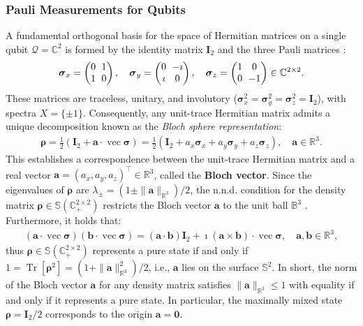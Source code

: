\documentclass[noinfoline]{imsart}\setcounter{tocdepth}{2}
\renewcommand{\b}[1]{\mathbb{#1}} %
\newcommand{\m}[1]{\mathbf{#1}} %
\renewcommand{\c}[1]{\mathcal{#1}} %
\newcommand{\mb}[1]{\boldsymbol{#1}} %
\newcommand{\tr}[1]{\operatorname{Tr}\left[#1\right]}
\renewcommand{\vec}{\operatorname{vec}}
\theoremstyle{plain}
\begin{document}
\subsubsection{Pauli Measurements for Qubits}
A fundamental orthogonal basis for the space of Hermitian matrices on a single qubit $\c{Q} = \b{C}^{2}$ is formed by the identity matrix $\m{I}_{2}$ and the three Pauli matrices \cite{nielsen2010quantum}:
\begin{equation*}
    \setlength{\arraycolsep}{0.3em} %
    \mb{\sigma}_{x} = 
    \begin{pmatrix}
    0 & 1 \\
    1 & 0 \vphantom{-1}
    \end{pmatrix}, \quad
    \mb{\sigma}_{y} = 
    \begin{pmatrix}
    0 & -\imath \\
    \imath & 0
    \end{pmatrix}, \quad
    \mb{\sigma}_{z} = 
    \begin{pmatrix}
    1 & 0 \\
    0 & -1
    \end{pmatrix} \in \b{C}^{2 \times 2}.
\end{equation*}
These matrices are traceless, unitary, and involutory ($\mb{\sigma}_{x}^{2}=\mb{\sigma}_{y}^{2}= \mb{\sigma}_{z}^{2}= \m{I}_{2}$), with spectra $X = \{\pm 1 \}$. 
Consequently, any unit-trace Hermitian matrix admits a unique decomposition known as the \emph{Bloch sphere representation}:
\begin{align}\label{eq:Bloch:repre}
    \mb{\rho} = \frac{1}{2} (\m{I}_{2} + \m{a} \cdot \vec{\mb{\sigma}})
    = \frac{1}{2} (\m{I}_{2} + a_{x} \mb{\sigma}_{x} + a_{y} \mb{\sigma}_{y} + a_{z} \mb{\sigma}_{z}), \quad \m{a} \in \b{R}^{3}.
\end{align}
This establishes a correspondence between the unit-trace Hermitian matrix and a real vector $\m{a} = (a_{x}, a_{y}, a_{z})^{\top} \in \b{R}^{3}$, called the \textbf{Bloch vector}. Since the eigenvalues of $\mb{\rho}$ are $\lambda_{\pm} = (1 \pm \|\m{a}\|_{\b{R}^{3}})/2$, the n.n.d. condition for the density matrix $\mb{\rho} \in \b{S}(\b{C}_{+}^{2 \times 2})$ restricts the Bloch vector $\m{a}$ to the unit ball $\b{B}^{3}$ \cite{sakurai2017modern}. Furthermore, it holds that:
\begin{align*}
    (\m{a} \cdot \vec{\mb{\sigma}}) (\m{b} \cdot \vec{\mb{\sigma}}) = (\m{a} \cdot \m{b}) \m{I}_{2} + \imath (\m{a} \times \m{b}) \cdot \vec{\mb{\sigma}}, \quad \m{a}, \m{b} \in \b{R}^{3},
\end{align*}
thus $\mb{\rho} \in \b{S}(\b{C}_{+}^{2 \times 2})$ represents a pure state if and only if $1= \tr{\mb{\rho}^{2}} = (1 + \|\m{a}\|_{\b{R}^{3}}^{2})/2$, i.e., $\m{a}$ lies on the surface $\b{S}^{2}$. In short, the norm of the Bloch vector $\m{a}$  for any density matrix satisfies $\|\m{a}\|_{\b{R}^{3}} \le 1$ with equality if and only if it represents a pure state. In particular, the maximally mixed state $\mb{\rho} = \m{I}_{2}/2$ corresponds to the origin $\m{a} = \m{0}$.
\end{document}
